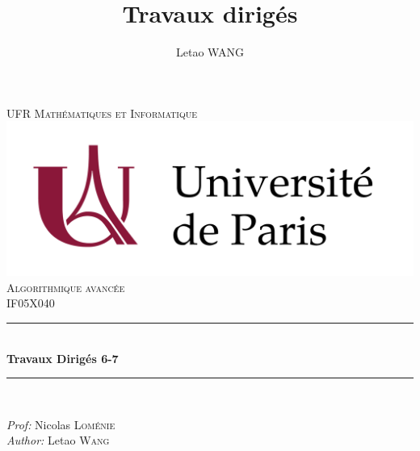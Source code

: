 \documentclass[12pt]{fphw}
\begin{document}
\title{Travaux dirigés } %
\author{Letao WANG}
\begin{titlepage}

\newcommand{\HRule}{\rule{\linewidth}{0.5mm}} %

\center %
 

\textsc{\large UFR Mathématiques et Informatique }\\[1.5cm] %
\includegraphics[scale=.2]{logo_u-paris_tex_regular.png}\\[1cm] %
\textsc{\Large Algorithmique avancée}\\[0.5cm] %
\textsc{\large IF05X040}\\[0.5cm] %


\HRule \\[0.4cm]
{ \huge \bfseries Travaux Dirigés 6-7}\\[0.4cm] %
\HRule \\[1.5cm]
 

\begin{minipage}{0.4\textwidth}
\begin{flushleft} \large
\emph{Prof: }Nicolas \textsc{Loménie }\\
\emph{Author: }Letao \textsc{Wang}\\
\end{flushleft}


\end{minipage}
\end{titlepage}
\end{document}
